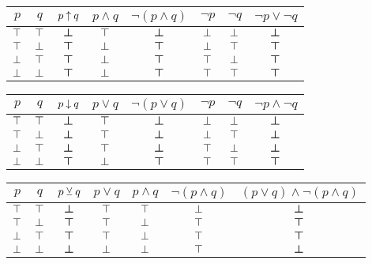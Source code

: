 		\begin{center}
			\begin{tabular}{cc|cccccc}
				$p$ & $q$ & $p \mathbin{\uparrow} q$ & $p \land q$ & $\lnot(p \land q)$ & $\lnot{p}$ & $\lnot{q}$ & $\lnot{p} \lor \lnot{q}$ \\
				\hline
				$\top$ & $\top$ & $\bm{\bot}$ & $\top$ & $\bm{\bot}$ & $\bot$ & $\bot$ & $\bm{\bot}$ \\
				$\top$ & $\bot$ & $\bm{\top}$ & $\bot$ & $\bm{\top}$ & $\bot$ & $\top$ & $\bm{\top}$ \\
				$\bot$ & $\top$ & $\bm{\top}$ & $\bot$ & $\bm{\top}$ & $\top$ & $\bot$ & $\bm{\top}$ \\
				$\bot$ & $\bot$ & $\bm{\top}$ & $\bot$ & $\bm{\top}$ & $\top$ & $\top$ & $\bm{\top}$
			\end{tabular}
		\end{center}
		
		\begin{center}
			\begin{tabular}{cc|cccccc}
				$p$ & $q$ & $p \mathbin{\downarrow} q$ & $p \lor q$ & $\lnot(p \lor q)$ & $\lnot{p}$ & $\lnot{q}$ & $\lnot{p} \land \lnot{q}$ \\
				\hline
				$\top$ & $\top$ & $\bm{\bot}$ & $\top$ & $\bm{\bot}$ & $\bot$ & $\bot$ & $\bm{\bot}$ \\
				$\top$ & $\bot$ & $\bm{\bot}$ & $\top$ & $\bm{\bot}$ & $\bot$ & $\top$ & $\bm{\bot}$ \\
				$\bot$ & $\top$ & $\bm{\bot}$ & $\top$ & $\bm{\bot}$ & $\top$ & $\bot$ & $\bm{\bot}$ \\
				$\bot$ & $\bot$ & $\bm{\top}$ & $\bot$ & $\bm{\top}$ & $\top$ & $\top$ & $\bm{\top}$
			\end{tabular}
		\end{center}
		
		\begin{center}
			\begin{tabular}{cc|ccccc}
				$p$ & $q$ & $p \mathbin{\veebar} q$ & $p \lor q$ & $p \land q$ & $\lnot(p \land q)$ & $(p \lor q) \land \lnot(p \land q)$  \\
				\hline
				$\top$ & $\top$ & $\bm{\bot}$ & $\top$ & $\top$ & $\bot$ & $\bm{\bot}$ \\
				$\top$ & $\bot$ & $\bm{\top}$ & $\top$ & $\bot$ & $\top$ & $\bm{\top}$ \\
				$\bot$ & $\top$ & $\bm{\top}$ & $\top$ & $\bot$ & $\top$ & $\bm{\top}$ \\
				$\bot$ & $\bot$ & $\bm{\bot}$ & $\bot$ & $\bot$ & $\top$ & $\bm{\bot}$
			\end{tabular}
		\end{center}
		
